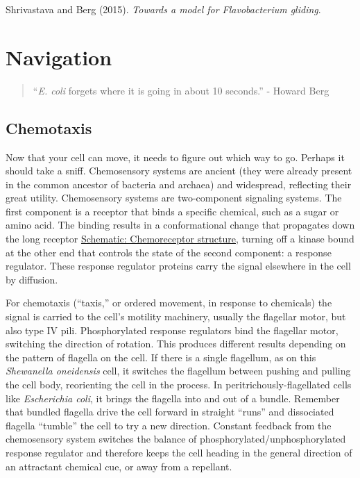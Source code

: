\documentclass[]{tufte-book}
\begin{document}
Shrivastava and Berg (2015). \emph{Towards a model for Flavobacterium
gliding}.\citep{shrivastava2015}

\chapter{Navigation}\label{navigation}

\begin{quote}
``\emph{E. coli} forgets where it is going in about 10 seconds.'' -
Howard Berg \citep{berg1988}
\end{quote}

\section{Chemotaxis}\label{chemotaxis}

Now that your cell can move, it needs to figure out which way to go.
Perhaps it should take a sniff. Chemosensory systems are ancient (they
were already present in the common ancestor of bacteria and archaea) and
widespread, reflecting their great utility. Chemosensory systems are
two-component signaling systems. The first component is a receptor that
binds a specific chemical, such as a sugar or amino acid. The binding
results in a conformational change that propagates down the long
receptor \protect\hyperlink{Chemoreceptor_structure}{Schematic:
Chemoreceptor structure}, turning off a kinase bound at the other end
that controls the state of the second component: a response regulator.
These response regulator proteins carry the signal elsewhere in the cell
by diffusion.

For chemotaxis (``taxis,'' or ordered movement, in response to
chemicals) the signal is carried to the cell's motility machinery,
usually the flagellar motor, but also type IV pili. Phosphorylated
response regulators bind the flagellar motor, switching the direction of
rotation. This produces different results depending on the pattern of
flagella on the cell. If there is a single flagellum, as on this
\emph{Shewanella oneidensis} cell, it switches the flagellum between
pushing and pulling the cell body, reorienting the cell in the process.
In peritrichously-flagellated cells like \emph{Escherichia coli}, it
brings the flagella into and out of a bundle. Remember that bundled
flagella drive the cell forward in straight ``runs'' and dissociated
flagella ``tumble'' the cell to try a new direction. Constant feedback
from the chemosensory system switches the balance of
phosphorylated/unphosphorylated response regulator and therefore keeps
the cell heading in the general direction of an attractant chemical cue,
or away from a repellant.
\end{document}
